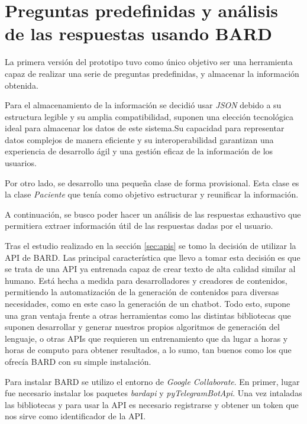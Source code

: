 \section{Preguntas predefinidas y análisis de las respuestas usando BARD}
\label{sec:prototipoBARD}
La primera versión del prototipo tuvo como único objetivo ser una herramienta capaz de realizar una serie de preguntas predefinidas, y almacenar la información obtenida.

Para el almacenamiento de la información se decidió usar \textit{JSON} debido a su estructura legible y su amplia compatibilidad, suponen una elección tecnológica ideal para almacenar los datos de este sistema.Su capacidad para representar datos complejos de manera eficiente y su interoperabilidad garantizan una experiencia de desarrollo ágil y una gestión eficaz de la información de los usuarios. 

Por otro lado, se desarrollo una pequeña clase de forma provisional. Esta clase es la clase \textit{Paciente} que tenía como objetivo estructurar y reunificar la información.

A continuación, se busco poder hacer un análisis de las respuestas exhaustivo que permitiera extraer información útil de las respuestas dadas por el usuario.

Tras el estudio realizado en la sección \ref{sec:apis} se tomo la decisión de utilizar la API de BARD. Las principal característica que llevo a tomar esta decisión es que se trata de una API ya entrenada capaz de crear texto de alta calidad similar al humano. Está hecha a medida para desarrolladores y creadores de contenidos, permitiendo la automatización de la generación de contenidos para diversas necesidades, como en este caso la generación de un chatbot. Todo esto, supone una gran ventaja frente a otras herramientas como las distintas bibliotecas que suponen desarrollar y generar nuestros propios algoritmos de generación del lenguaje, o otras APIs que requieren un entrenamiento que da lugar a horas y horas de computo para obtener resultados, a lo sumo, tan buenos como los que ofrecía BARD con su simple instalación. 

Para instalar BARD se utilizo el entorno de \textit{Google Collaborate}. En primer, lugar fue necesario instalar los paquetes \textit{bardapi} y \textit{pyTelegramBotApi}. Una vez intaladas las bibliotecas y para usar la API es necesario registrarse y obtener un token que nos sirve como identificador de la API. 

